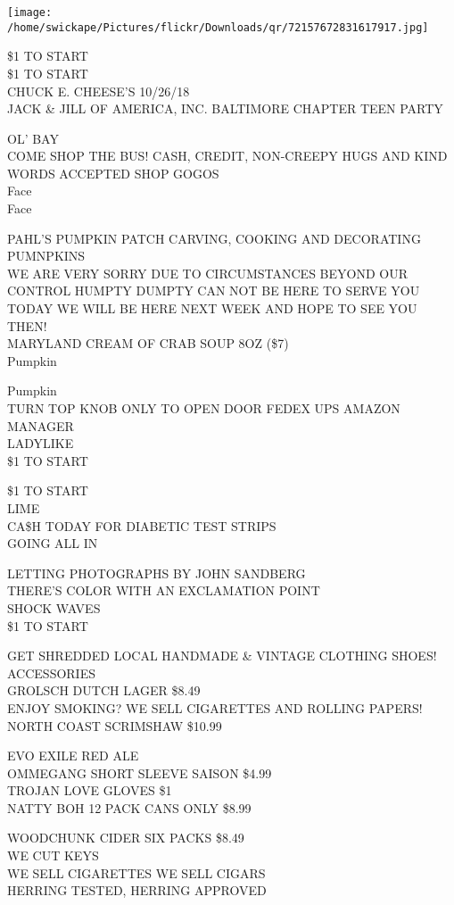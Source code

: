 \documentclass[10pt,letterpaper]{article}
\begin{document}
\texttt{[image: /home/swickape/Pictures/flickr/Downloads/qr/72157672831617917.jpg]}


\$1 TO START\\
\$1 TO START\\
CHUCK E. CHEESE'S 10/26/18\\
JACK \& JILL OF AMERICA, INC. BALTIMORE CHAPTER TEEN PARTY

OL' BAY\\
COME SHOP THE BUS!  CASH, CREDIT, NON{-}CREEPY HUGS AND KIND WORDS ACCEPTED SHOP GOGOS\\
Face\\
Face

PAHL'S PUMPKIN PATCH CARVING, COOKING AND DECORATING PUMNPKINS\\
WE ARE VERY SORRY DUE TO CIRCUMSTANCES BEYOND OUR CONTROL HUMPTY DUMPTY CAN NOT BE HERE TO SERVE YOU TODAY WE WILL BE HERE NEXT WEEK AND HOPE TO SEE YOU THEN!\\
MARYLAND CREAM OF CRAB SOUP 8OZ (\$7)\\
Pumpkin

Pumpkin\\
TURN TOP KNOB ONLY TO OPEN DOOR FEDEX UPS AMAZON MANAGER\\
LADYLIKE\\
\$1 TO START

\$1 TO START\\
LIME\\
CA\$H TODAY FOR DIABETIC TEST STRIPS\\
GOING ALL IN

LETTING PHOTOGRAPHS BY JOHN SANDBERG\\
THERE'S COLOR WITH AN EXCLAMATION POINT\\
SHOCK WAVES\\
\$1 TO START

GET SHREDDED LOCAL HANDMADE \& VINTAGE CLOTHING SHOES! ACCESSORIES\\
GROLSCH DUTCH LAGER \$8.49\\
ENJOY SMOKING?  WE SELL CIGARETTES AND ROLLING PAPERS!\\
NORTH COAST SCRIMSHAW \$10.99

EVO EXILE RED ALE\\
OMMEGANG SHORT SLEEVE SAISON \$4.99\\
TROJAN LOVE GLOVES \$1\\
NATTY BOH 12 PACK CANS ONLY \$8.99

WOODCHUNK CIDER SIX PACKS \$8.49\\
WE CUT KEYS\\
WE SELL CIGARETTES WE SELL CIGARS\\
HERRING TESTED, HERRING APPROVED
\end{document}

